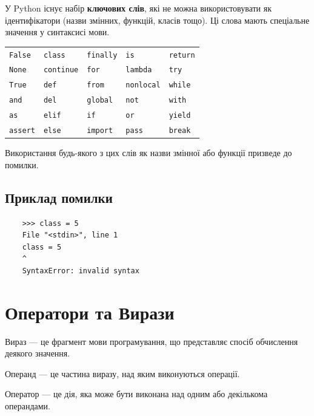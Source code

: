 У Python існує набір \textbf{ключових слів}, які не можна використовувати як ідентифікатори (назви змінних, функцій, класів тощо).  
Ці слова мають спеціальне значення у синтаксисі мови.

\begin{center}
	\begin{tabular}{lllll}
		\texttt{False} & \texttt{class} & \texttt{finally} & \texttt{is} & \texttt{return} \\
		\texttt{None} & \texttt{continue} & \texttt{for} & \texttt{lambda} & \texttt{try} \\
		\texttt{True} & \texttt{def} & \texttt{from} & \texttt{nonlocal} & \texttt{while} \\
		\texttt{and} & \texttt{del} & \texttt{global} & \texttt{not} & \texttt{with} \\
		\texttt{as} & \texttt{elif} & \texttt{if} & \texttt{or} & \texttt{yield} \\
		\texttt{assert} & \texttt{else} & \texttt{import} & \texttt{pass} & \texttt{break} \\
	\end{tabular}
\end{center}

\medskip
\noindent Використання будь-якого з цих слів як назви змінної або функції призведе до помилки.

\subsection*{Приклад помилки}

\begin{verbatim}
	>>> class = 5
	File "<stdin>", line 1
	class = 5
	^
	SyntaxError: invalid syntax
\end{verbatim}

\section{Оператори та Вирази}

\begin{defn}{Вираз — це}
	фрагмент мови програмування, що представляє спосіб обчислення деякого значення.
\end{defn}
\begin{defn}{Операнд — це}
	частина виразу, над яким виконуються операції.
\end{defn}
\begin{defn}{Оператор — це}
	дія, яка може бути виконана над одним або декількома операндами.
\end{defn}

